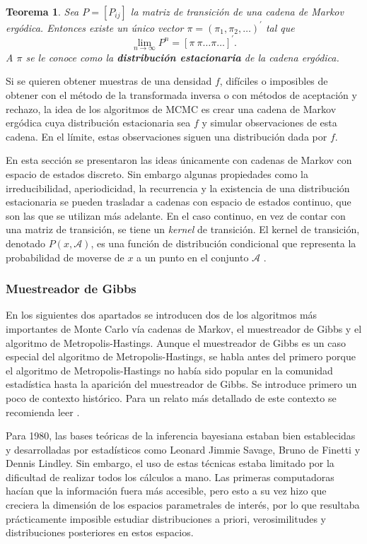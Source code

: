 \documentclass[11pt,a4paper]{article}
\newtheorem{theorem}{Teorema}[section]
\begin{document}
\begin{theorem}
\label{teo:ergodic}
Sea $P=[P_{ij}]$ la matriz de transición de una cadena de Markov ergódica. Entonces existe un único vector $\pi = (\pi_1, \pi_2, \dots)^\prime$ tal que
\begin{equation} \label{dist_limite}
\lim_{n \to \infty}P^n = [\pi \ \pi \dots \pi \dots ]^\prime.
\end{equation}
A $\pi$ se le conoce como la \textbf{distribución estacionaria} de la cadena ergódica.
\end{theorem}

Si se quieren obtener muestras de una densidad $f$, difíciles o imposibles de obtener con el método de la transformada inversa o con métodos de aceptación y rechazo, la idea de los algoritmos de MCMC es crear una cadena de Markov ergódica cuya distribución estacionaria sea $f$ y simular observaciones de esta cadena. En el límite, estas observaciones siguen una distribución dada por $f$.

En esta sección se presentaron las ideas únicamente con cadenas de Markov con espacio de estados discreto. Sin embargo algunas propiedades como la irreducibilidad, aperiodicidad, la recurrencia y la existencia de una distribución estacionaria se pueden trasladar a cadenas con espacio de estados continuo, que son las que se utilizan más adelante. En el caso continuo, en vez de contar con una matriz de transición, se tiene un \textit{kernel} de transición. El kernel de transición, denotado $P(x, \mathcal{A})$, es una función de distribución condicional que representa la probabilidad de moverse de $x$ a un punto en el conjunto $\mathcal{A}$ \citep{chib_mh}.

\subsubsection*{Muestreador de Gibbs}
En los siguientes dos apartados se introducen dos de los algoritmos más importantes de Monte Carlo vía cadenas de Markov, el muestreador de Gibbs y el algoritmo de Metropolis-Hastings. Aunque el muestreador de Gibbs es un caso especial del algoritmo de Metropolis-Hastings, se habla antes del primero porque el algoritmo de Metropolis-Hastings no había sido popular en la comunidad estadística hasta la aparición del muestreador de Gibbs. Se introduce primero un poco de contexto histórico. Para un relato más detallado de este contexto se recomienda leer \citet{bertsch}.

Para 1980, las bases teóricas de la inferencia bayesiana estaban bien establecidas y desarrolladas por estadísticos como Leonard Jimmie Savage, Bruno de Finetti y Dennis Lindley. Sin embargo, el uso de estas técnicas estaba limitado por la dificultad de realizar todos los cálculos a mano. Las primeras computadoras hacían que la información fuera más accesible, pero esto a su vez hizo que creciera la dimensión de los espacios parametrales de interés, por lo que resultaba prácticamente imposible estudiar distribuciones a priori, verosimilitudes y distribuciones posteriores en estos espacios.
\end{document}
